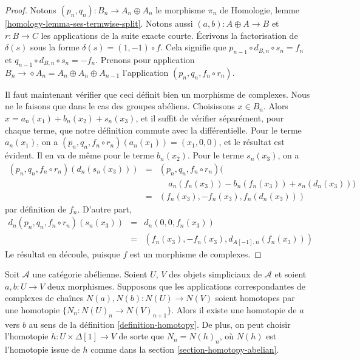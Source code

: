 \begin{proof}
Notons $(p_n, q_n) : B_n \to A_n \oplus A_n$ le morphisme $\pi_n$ de
Homologie, lemme \ref{homology-lemma-ses-termwise-split}.
Notons aussi $(a, b) : A \oplus A \to B$ et $r : B \to C$ les applications
de la suite exacte courte. Écrivons la factorisation de $\delta(s)$ sous la
forme $\delta(s) = (1, -1) \circ f$. Cela signifie que
$p_{n - 1} \circ d_{B, n} \circ s_n = f_n$ et
$q_{n - 1} \circ d_{B, n} \circ s_n = - f_n$.
Prenons pour application $B_n \to \diamond A_n = A_n \oplus A_n \oplus A_{n - 1}$
l'application $(p_n, q_n, f_n \circ r_n)$.

\medskip\noindent
Il faut maintenant vérifier que ceci définit bien un morphisme de complexes.
Nous ne le faisons que dans le cas des groupes abéliens.
Choisissons $x \in B_n$. Alors $x = a_n(x_1) + b_n(x_2) + s_n(x_3)$,
et il suffit de vérifier séparément, pour chaque terme, que notre définition
commute avec la différentielle. Pour le terme
$a_n(x_1)$, on a $(p_n, q_n, f_n \circ r_n)(a_n(x_1)) =
(x_1, 0, 0)$, et le résultat est évident. Il en va de même pour
le terme $b_n(x_2)$. Pour le terme $s_n(x_3)$, on a
\begin{eqnarray*}
(p_n, q_n, f_n \circ r_n)(d_n(s_n(x_3))) & = &
(p_n, q_n, f_n \circ r_n)( \\
& & \ \ \ \ \ a_n(f_n(x_3)) - b_n(f_n(x_3)) + s_n(d_n(x_3))) \\
& = &
(f_n(x_3), -f_n(x_3), f_n(d_n(x_3)))
\end{eqnarray*}
par définition de $f_n$. D'autre part,
\begin{eqnarray*}
d_n(p_n, q_n, f_n \circ r_n)(s_n(x_3)) & = & d_n(0, 0, f_n(x_3)) \\
& = &
(f_n(x_3), - f_n(x_3), d_{A[-1], n}(f_n(x_3)))
\end{eqnarray*}
Le résultat en découle, puisque $f$ est un morphisme de complexes.
\end{proof}

\begin{lemma}
\label{lemma-backwards-homotopy}
Soit $\mathcal{A}$ une catégorie abélienne. Soient $U$, $V$ des objets
simpliciaux de $\mathcal{A}$ et soient $a, b : U \to V$ deux morphismes.
Supposons que les applications correspondantes de complexes de chaînes
$N(a), N(b) : N(U) \to N(V)$ soient homotopes par une homotopie
$\{N_n : N(U)_n \to N(V)_{n + 1}\}$.
Alors il existe une homotopie de $a$ vers $b$ au sens de la
définition \ref{definition-homotopy}. De plus, on peut choisir l'homotopie
$h : U \times \Delta[1] \to V$ de sorte que $N_n = N(h)_n$, où $N(h)$ est
l'homotopie issue de $h$ comme dans la section \ref{section-homotopy-abelian}.
\end{lemma}

